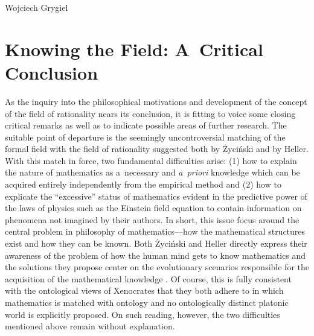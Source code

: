 \begin{artengenv}{Wojciech Grygiel}
\section{Knowing the Field: A~Critical Conclusion}
As the inquiry into the philosophical motivations and development of the concept of the field of rationality nears its conclusion, it is fitting to voice some closing critical remarks as well as to indicate possible areas of further research. The suitable point of departure is the seemingly uncontroversial matching of the formal field with the field of rationality suggested both by Życiński and by Heller. With this match in force, two fundamental difficulties arise: (1) how to explain the nature of mathematics as a~necessary and \textit{a~priori} knowledge which can be acquired entirely independently from the empirical method and (2) how to explicate the ``excessive'' status of mathematics evident in the predictive power of the laws of physics such as the Einstein field equation to contain information on phenomena not imagined by their authors. In short, this issue focus around the central problem in philosophy of mathematics—how the mathematical structures exist and how they can be known. Both Życiński and Heller directly express their awareness of the problem of how the human mind gets to know mathematics and the solutions they propose center on the evolutionary scenarios responsible for the acquisition of the mathematical knowledge
\parencites[][]{heller_co_2010}[][]{heller_jak_2010}. %
 Of course, this is fully consistent with the ontological views of Xenocrates that they both adhere to in which mathematics is matched with ontology and no ontologically distinct platonic world is explicitly proposed. On such reading, however, the two difficulties mentioned above remain without explanation.


\end{artengenv}
